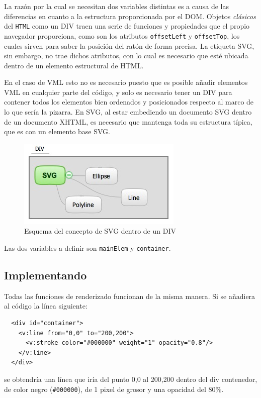 La razón por la cual se necesitan dos variables distintas es a causa de las diferencias en cuanto a la estructura proporcionada por el DOM. Objetos \emph{clásicos} del \texttt{HTML} como un DIV traen una serie de funciones y propiedades que el propio navegador proporciona, como son los atributos \texttt{offsetLeft} y \texttt{offsetTop}, los cuales sirven para saber la posición del ratón de forma precisa. La etiqueta SVG, sin embargo, no trae dichos atributos, con lo cual es necesario que esté ubicada dentro de un elemento estructural de HTML.

En el caso de VML esto no es necesario puesto que es posible añadir elementos VML en cualquier parte del código, y solo es necesario tener un DIV para contener todos los elementos bien ordenados y posicionados respecto al marco de lo que sería la pizarra. En SVG, al estar embediendo un documento SVG dentro de un documento XHTML, es necesario que mantenga toda su estructura típica, que es con un elemento base SVG.

\begin{figure}[h!]
\centering
\includegraphics{divsvg.png}
\caption{Esquema del concepto de SVG dentro de un DIV}\label{fig:divsvg}
\end{figure}

Las dos variables a definir son \texttt{mainElem} y \texttt{container}.

\subsection{Implementando}
Todas las funciones de renderizado funcionan de la misma manera. Si se añadiera al código la línea siguiente:
\begin{verbatim}
  <div id="container">
    <v:line from="0,0" to="200,200">
      <v:stroke color="#000000" weight="1" opacity="0.8"/>
    </v:line>
  </div>
\end{verbatim}
se obtendría una línea que iría del punto 0,0 al 200,200 dentro del div contenedor, de color negro (\texttt{\#000000}), de 1 pixel de grosor y una opacidad del 80\%.

